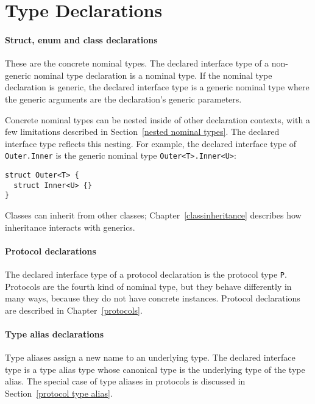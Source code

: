 \documentclass[a4paper,headsepline,bibliography=totoc,toc=flat,fleqn,twoside=semi]{scrbook}
\theoremstyle{definition}
\theoremstyle{definition}
\theoremstyle{definition}
\begin{document}
\section{Type Declarations}\label{type declarations}

\paragraph{Struct, enum and class declarations}
These are the concrete nominal types. The declared interface type of a non-generic nominal type declaration is a nominal type. If the nominal type declaration is generic, the declared interface type is a generic nominal type where the generic arguments are the declaration's generic parameters.

Concrete nominal types can be nested inside of other declaration contexts, with a few limitations described in Section~\ref{nested nominal types}. The declared interface type reflects this nesting. For example, the declared interface type of \texttt{Outer.Inner} is the generic nominal type \texttt{Outer<T>.Inner<U>}:
\begin{Verbatim}
struct Outer<T> {
  struct Inner<U> {}
}
\end{Verbatim}
Classes can inherit from other classes; Chapter~\ref{classinheritance} describes how inheritance interacts with generics.

\paragraph{Protocol declarations}
The declared interface type of a protocol declaration is the protocol type \texttt{P}. Protocols are the fourth kind of nominal type, but they behave differently in many ways, because they do not have concrete instances. Protocol declarations are described in Chapter~\ref{protocols}.

\paragraph{Type alias declarations}
Type aliases assign a new name to an underlying type. The declared interface type is a type alias type whose canonical type is the underlying type of the type alias. The special case of type aliases in protocols is discussed in Section~\ref{protocol type alias}.
\end{document}
